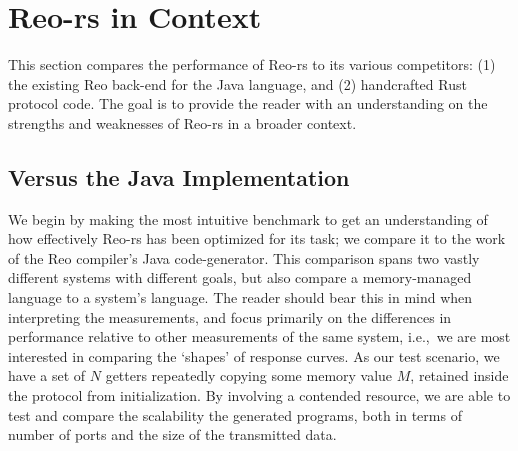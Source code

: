\section{Reo-rs in Context}
\label{sec:in_context}
This section compares the performance of Reo-rs to its various competitors: (1) the existing Reo back-end for the Java language, and (2) handcrafted Rust protocol code. The goal is to provide the reader with an understanding on the strengths and weaknesses of Reo-rs in a broader context.

\subsection{Versus the Java Implementation}
We begin by making the most intuitive benchmark to get an understanding of how effectively Reo-rs has been optimized for its task; we compare it to the work of the Reo compiler's Java code-generator. This comparison spans two vastly different systems with different goals, but also compare a memory-managed language to a system's language. The reader should bear this in mind when interpreting the measurements, and focus primarily on the differences in performance relative to other measurements of the same system, i.e.,\ we are most interested in comparing the `shapes' of response curves. As our test scenario, we have a set of $N$ getters repeatedly copying some memory value $M$, retained inside the protocol from initialization. By involving a contended resource, we are able to test and compare the scalability the generated programs, both in terms of number of ports and the size of the transmitted data.

